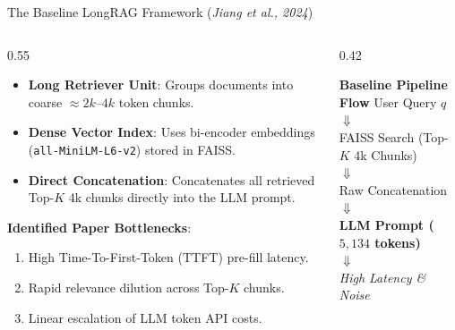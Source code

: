 \documentclass[10pt,aspectratio=169]{beamer}
\begin{document}
\begin{frame}{The Baseline LongRAG Framework (\textit{Jiang et al., 2024})}
    \begin{columns}[onlytextwidth,T]
        \begin{column}{0.55\textwidth}
            \begin{itemize}
                \item \textbf{Long Retriever Unit}: Groups documents into coarse $\approx 2k$--$4k$ token chunks.
                \item \textbf{Dense Vector Index}: Uses bi-encoder embeddings (\texttt{all-MiniLM-L6-v2}) stored in FAISS.
                \item \textbf{Direct Concatenation}: Concatenates all retrieved Top-$K$ 4k chunks directly into the LLM prompt.
            \end{itemize}
            
            \vspace{0.15cm}
            \textbf{Identified Paper Bottlenecks}:
            \begin{enumerate}
                \item High Time-To-First-Token (TTFT) pre-fill latency.
                \item Rapid relevance dilution across Top-$K$ chunks.
                \item Linear escalation of LLM token API costs.
            \end{enumerate}
        \end{column}
        
        \begin{column}{0.42\textwidth}
            \begin{exampleblock}{\textbf{Baseline Pipeline Flow}}
                \centering
                \footnotesize
                User Query $q$ \\
                $\Downarrow$ \\
                FAISS Search (Top-$K$ 4k Chunks) \\
                $\Downarrow$ \\
                Raw Concatenation \\
                $\Downarrow$ \\
                \textbf{LLM Prompt ($5,134$ tokens)} \\
                $\Downarrow$ \\
                \textit{High Latency \& Noise}
            \end{exampleblock}
        \end{column}
    \end{columns}
\end{frame}
\end{document}
